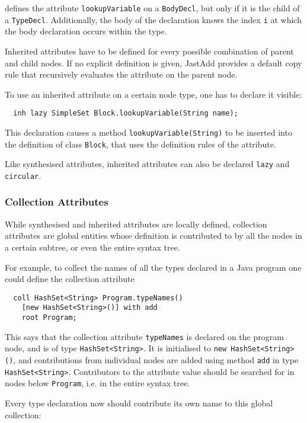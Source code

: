 \documentclass{article}
\newcommand{\nt}[1]{\texttt{#1}}
\newcommand{\code}[1]{\lstinline$#1$}
\begin{document}
\noindent defines the attribute \code{lookupVariable} on a \nt{BodyDecl}, but only if it is the child of a \nt{TypeDecl}. Additionally, the body of the declaration knows the index \code{i} at which the body declaration occurs within the type.

Inherited attributes have to be defined for every possible combination of parent and child nodes. If no explicit definition is given, JastAdd provides a default copy rule that recursively evaluates the attribute on the parent node.

To use an inherited attribute on a certain node type, one has to declare it visible:

\begin{lstlisting}
  inh lazy SimpleSet Block.lookupVariable(String name);
\end{lstlisting}

This declaration causes a method \code{lookupVariable(String)} to be inserted into the definition of class \code{Block}, that uses the definition rules of the attribute.

Like synthesised attributes, inherited attributes can also be declared \code{lazy} and \code{circular}.

\subsubsection{Collection Attributes}
While synthesised and inherited attributes are locally defined, collection attributes are global entities whose definition is contributed to by all the nodes in a certain subtree, or even the entire syntax tree.

For example, to collect the names of all the types declared in a Java program one could define the collection attribute

\begin{lstlisting}
  coll HashSet<String> Program.typeNames()
    [new HashSet<String>()] with add
    root Program;
\end{lstlisting}

This says that the collection attribute \code{typeNames} is declared on the program node, and is of type \code{HashSet<String>}. It is initialised to \code{new HashSet<String>()}, and contributions from individual nodes are added using method \code{add} in type \code{HashSet<String>}. Contributors to the attribute value should be searched for in nodes below \nt{Program}, i.e. in the entire syntax tree.

Every type declaration now should contribute its own name to this global collection:
\end{document}
